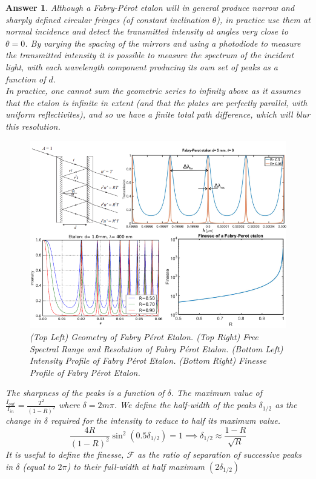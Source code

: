 \documentclass[a4paper]{article}
\newtheorem{ans}{Answer}[subsection]
\theoremstyle{new}
\begin{document}
\begin{ans}
Although a Fabry-Pérot etalon will in general produce narrow and sharply defined circular fringes (of constant inclination $\theta$), in practice use them at normal incidence and detect the transmitted intensity at angles very close to $\theta=0$. By varying the spacing of the mirrors and using a photodiode to measure the transmitted intensity it is possible to measure the spectrum of the incident light, with each wavelength component producing its own set of peaks as a function of $d$.\\[5pt]
In practice, one cannot sum the geometric series to infinity above as it assumes that the etalon is infinite in extent (and that the plates are perfectly parallel, with uniform reflectivites), and so we have a finite total path difference, which will blur this resolution.
\begin{figure}[H]
    \centering
    \includegraphics[width=\linewidth]{fabryperot.PNG}
    \caption{(Top Left) Geometry of Fabry Pérot Etalon. (Top Right) Free Spectral Range and Resolution of Fabry Pérot Etalon. (Bottom Left) Intensity Profile of Fabry Pérot Etalon. (Bottom Right) Finesse Profile of Fabry Pérot Etalon.}
\end{figure}
The sharpness of the peaks is a function of $\delta$. The maximum value of $\frac{I_{out}}{I_{in}}=\frac{T^2}{(1-R)^2}$ where $\delta=2m\pi$. We define the half-width of the peaks $\delta_{1/2}$ as the change in $\delta$ required for the intensity to reduce to half its maximum value.
$$\frac{4R}{(1-R)^2}\sin^2(0.5\delta_{1/2})=1\implies\delta_{1/2}\approx\frac{1-R}{\sqrt{R}}$$
It is useful to define the finesse, $\mathcal{F}$ as the ratio of separation of successive peaks in $\delta$ (equal to $2\pi$) to their full-width at half maximum $(2\delta_{1/2})$

\end{ans}
\end{document}
